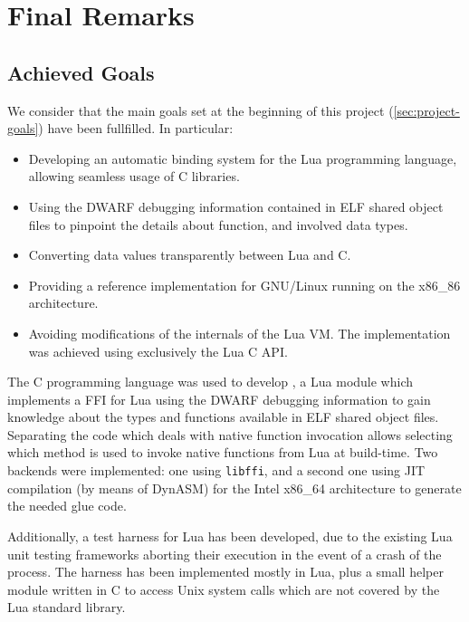 \cleardoublepage

\chapter{Final Remarks}

\section{Achieved Goals}

We consider that the main goals set at the beginning of this project
(\autoref{sec:project-goals}) have been fullfilled. In particular:

\begin{itemize}

	\item Developing an automatic binding system for the Lua programming
	language, allowing seamless usage of C libraries.

	\item Using the DWARF debugging information contained in ELF shared object
	files to pinpoint the details about function, and involved data types.

	\item Converting data values transparently between Lua and C.

	\item Providing a reference implementation for GNU/Linux running on the
	x86\_86 architecture.

	\item Avoiding modifications of the internals of the Lua VM. The
	implementation was achieved using exclusively the Lua C API.

\end{itemize}

The C programming language was used to develop \Eol*, a Lua module which
implements a FFI for Lua using the DWARF debugging information to gain
knowledge about the types and functions available in ELF shared object files.
Separating the code which deals with native function invocation allows
selecting which method is used to invoke native functions from Lua at
build-time. Two backends were implemented: one using \verb|libffi|, and
a second one using JIT compilation (by means of DynASM) for the Intel x86\_64
architecture to generate the needed glue code.

Additionally, a test harness for Lua has been developed, due to the existing
Lua unit testing frameworks aborting their execution in the event of a crash
of the process. The harness has been implemented mostly in Lua, plus a small
helper module written in C to access Unix system calls which are not covered
by the Lua standard library.

